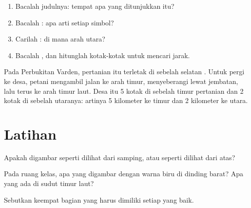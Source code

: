 
\begin{method}\label{met:g2:drawing-to-map:read}
\begin{enumerate}
  \item Bacalah judulnya: tempat apa yang ditunjukkan  itu?
  \item Bacalah : apa arti setiap simbol?
  \item Carilah : di mana arah utara?
  \item Bacalah , dan hitunglah kotak-kotak untuk mencari jarak.
\end{enumerate}
\end{method}

\begin{example}\label{ex:g2:drawing-to-map:farm}
Pada  Perbukitan Varden, pertanian itu terletak di sebelah selatan
. Untuk pergi ke desa, petani mengambil jalan ke arah timur,
menyeberangi  lewat jembatan, lalu terus ke arah timur laut. Desa itu
5 kotak di sebelah timur pertanian dan 2 kotak di sebelah utaranya: artinya
5 kilometer ke timur dan 2 kilometer ke utara.
\end{example}

\section{Latihan}

\begin{exercise}[$\star$]\label{exo:g2:drawing-to-map:1}
Apakah  digambar seperti dilihat dari samping, atau seperti dilihat dari atas?
\end{exercise}

\begin{exercise}[$\star$]\label{exo:g2:drawing-to-map:2}
Pada  ruang kelas, apa yang digambar dengan warna biru di dinding
barat? Apa yang ada di sudut timur laut?
\end{exercise}

\begin{exercise}[$\star$]\label{exo:g2:drawing-to-map:3}
Sebutkan keempat bagian yang harus dimiliki setiap  yang baik.
\end{exercise}

